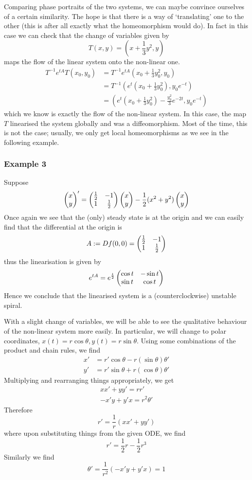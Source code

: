 Comparing phase portraits of the two systems, we can maybe convince ourselves of a certain similarity. The hope is that there is a way of `translating' one to the other (this is after all exactly what the homeomorphism would do). In fact in this case we can check that the change of variables given by
$$ T(x, y) = \left( x + \frac{1}{3}y^2, y \right) $$
maps the flow of the linear system onto the non-linear one.
\begin{align*}
    T^{-1} e^{tA} T(x_0, y_0) &= T^{-1} e^{tA} \left( x_0 + \frac{1}{3} y_0^2, y_0 \right)\\
    &= T^{-1}\left( e^t \left(x_0 + \frac{1}{3} y_0^2 \right), y_0 e^{-t} \right)\\
    &= \left( e^t \left(x_0 + \frac{1}{3} y_0^2 \right) - \frac{y_0^2}{3}e^{-2t}, y_0e^{-t} \right)
\end{align*}
which we know is exactly the flow of the non-linear system. In this case, the map $T$ linearised the system globally and was a diffeomorphism. Most of the time, this is not the case; usually, we only get local homeomorphisms as we see in the following example.

\subsubsection{Example 3}
Suppose 
$$ \begin{pmatrix} x\\y \end{pmatrix}' = \begin{pmatrix} \frac{1}{2} & -1\\1 & \frac{1}{2} \end{pmatrix} \begin{pmatrix} x\\y \end{pmatrix} - \frac{1}{2}(x^2 + y^2) \begin{pmatrix} x\\y \end{pmatrix} $$
Once again we see that the (only) steady state is at the origin and we can easily find that the differential at the origin is
$$ A := Df(0, 0) = \begin{pmatrix} \frac{1}{2} & -1\\1 & \frac{1}{2} \end{pmatrix} $$
thus the linearisation is given by
$$ e^{tA} = e^{\frac{t}{2}} \begin{pmatrix} \cos t & -\sin t\\ \sin t & \cos t \end{pmatrix} $$
Hence we conclude that the linearised system is a (counterclockwise) unstable spiral. 

With a slight change of variables, we will be able to see the qualitative behaviour of the non-linear system more easily. In particular, we will change to polar coordinates, $x(t) = r \cos \theta, y(t) = r \sin \theta$. Using some combinations of the product and chain rules, we find
\begin{align*}
    x' &= r' \cos\theta - r (\sin \theta) \theta'\\
    y' &= r' \sin \theta + r(\cos \theta) \theta'
\end{align*}
Multiplying and rearranging things appropriately, we get
\begin{align*}
    x x' + y y' = r r'\\
    -x'y + y'x = r^2 \theta'
\end{align*}
Therefore
$$ r' = \frac{1}{r} (xx' + y y') $$
where upon substituting things from the given ODE, we find 
$$ r' = \frac{1}{2} r - \frac{1}{2} r^3 $$
Similarly we find
$$ \theta' = \frac{1}{r^2} (-x'y + y'x) = 1 $$

